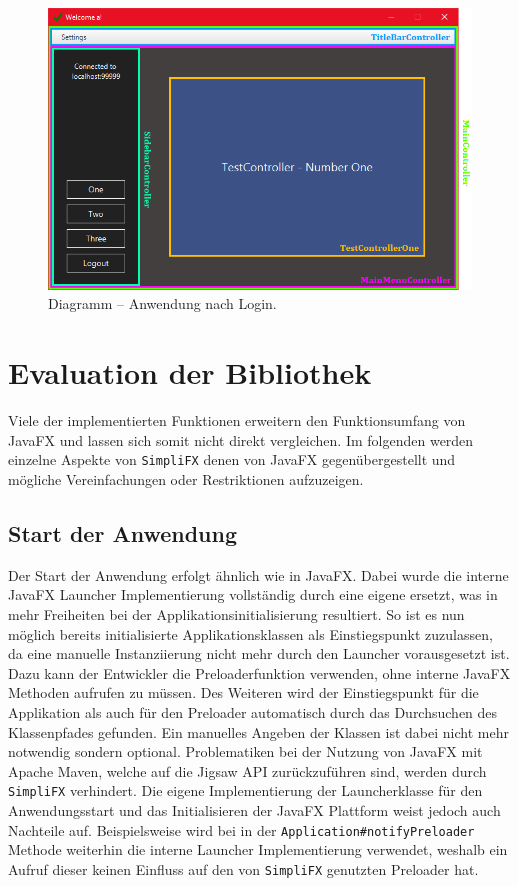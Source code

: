 \begin{figure}[H]
	\centering
	\includegraphics[width=\textwidth]{Abbildungen/MainMenu Screen.png}
	\caption{Diagramm -- Anwendung nach Login.}
	\label{fig:mainmenu_controller_demo}
\end{figure}
\section{Evaluation der Bibliothek}
Viele der implementierten Funktionen erweitern den Funktionsumfang von JavaFX und lassen sich somit nicht direkt vergleichen. Im folgenden werden einzelne Aspekte von \texttt{SimpliFX} denen von JavaFX gegenübergestellt und mögliche Vereinfachungen oder Restriktionen aufzuzeigen.
\subsection{Start der Anwendung}
Der Start der Anwendung erfolgt ähnlich wie in JavaFX. Dabei wurde die interne JavaFX Launcher Implementierung vollständig durch eine eigene ersetzt, was in mehr Freiheiten bei der Applikationsinitialisierung resultiert. So ist es nun möglich bereits initialisierte Applikationsklassen als Einstiegspunkt zuzulassen, da eine manuelle Instanziierung nicht mehr durch den Launcher vorausgesetzt ist. Dazu kann der Entwickler die Preloaderfunktion verwenden, ohne interne JavaFX Methoden aufrufen zu müssen. Des Weiteren wird der Einstiegspunkt für die Applikation als auch für den Preloader automatisch durch das Durchsuchen des Klassenpfades gefunden. Ein manuelles Angeben der Klassen ist dabei nicht mehr notwendig sondern optional. Problematiken bei der Nutzung von JavaFX mit Apache Maven, welche auf die Jigsaw API zurückzuführen sind, werden durch \texttt{SimpliFX} verhindert. Die eigene Implementierung der Launcherklasse für den Anwendungsstart und das Initialisieren der JavaFX Plattform weist jedoch auch Nachteile auf. Beispielsweise wird bei in der \texttt{Application\#notifyPreloader} Methode weiterhin die interne Launcher Implementierung verwendet, weshalb ein Aufruf dieser keinen Einfluss auf den von \texttt{SimpliFX} genutzten Preloader hat.
